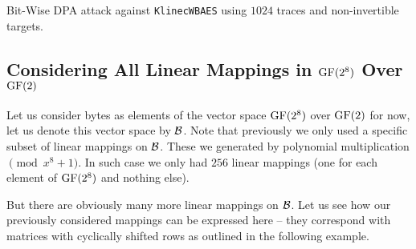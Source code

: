 \begin{landscape}
\begin{table}[H]
	\begin{center}
	
	\end{center}
\caption{Bit-Wise DPA attack against {\tt KlinecWBAES} using $1024$ traces and non-invertible targets.}
\label{tab:noninvtargets}
\end{table}
\end{landscape}



\subsection{Considering All Linear Mappings in $\mathrm{GF}(2^8)$ Over $\mathrm{GF}(2)$}

Let us consider bytes as elements of the vector space $\mathrm{GF}(2^8)$ over $\mathrm{GF}(2)$ for now, let us denote this vector space by $\cal B$. Note that previously we only used a specific subset of linear mappings on $\cal B$. These we generated by polynomial multiplication$\pmod{x^8+1}$. In such case we only had $256$ linear mappings (one for each element of $\mathrm{GF}(2^8)$ and nothing else).

But there are obviously many more linear mappings on $\cal B$. Let us see how our previously considered mappings can be expressed here -- they correspond with matrices with cyclically shifted rows as outlined in the following example.

